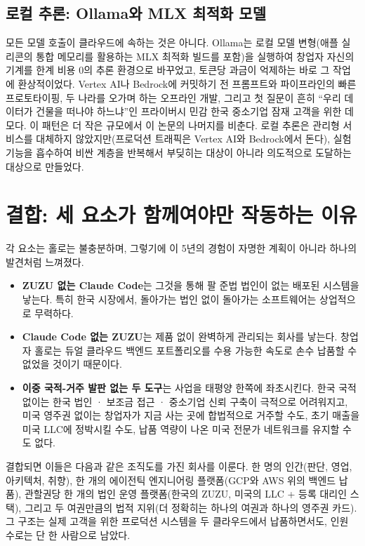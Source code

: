\documentclass{article}
\begin{document}
\subsection{로컬 추론: Ollama와 MLX 최적화 모델}

모든 모델 호출이 클라우드에 속하는 것은 아니다. Ollama는 로컬 모델 변형(애플 실리콘의 통합 메모리를 활용하는 MLX 최적화 빌드를 포함)을 실행하여 창업자 자신의 기계를 한계 비용 0의 추론 환경으로 바꾸었고, 토큰당 과금이 억제하는 바로 그 작업에 환상적이었다. Vertex AI나 Bedrock에 커밋하기 전 프롬프트와 파이프라인의 빠른 프로토타이핑, 두 나라를 오가며 하는 오프라인 개발, 그리고 첫 질문이 흔히 ``우리 데이터가 건물을 떠나야 하느냐''인 프라이버시 민감 한국 중소기업 잠재 고객을 위한 데모다. 이 패턴은 더 작은 규모에서 이 논문의 나머지를 비춘다. 로컬 추론은 관리형 서비스를 대체하지 않았지만(프로덕션 트래픽은 Vertex AI와 Bedrock에서 돈다), 실험 기능을 흡수하여 비싼 계층을 반복해서 부딪히는 대상이 아니라 의도적으로 도달하는 대상으로 만들었다.

\section{결합: 세 요소가 함께여야만 작동하는 이유}

각 요소는 홀로는 불충분하며, 그렇기에 이 5년의 경험이 자명한 계획이 아니라 하나의 발견처럼 느껴졌다.

\begin{itemize}
    \item \textbf{ZUZU 없는 Claude Code}는 그것을 통해 팔 준법 법인이 없는 배포된 시스템을 낳는다. 특히 한국 시장에서, 돌아가는 법인 없이 돌아가는 소프트웨어는 상업적으로 무력하다.
    \item \textbf{Claude Code 없는 ZUZU}는 제품 없이 완벽하게 관리되는 회사를 낳는다. 창업자 홀로는 듀얼 클라우드 백엔드 포트폴리오를 수용 가능한 속도로 손수 납품할 수 없었을 것이기 때문이다.
    \item \textbf{이중 국적-거주 발판 없는 두 도구}는 사업을 태평양 한쪽에 좌초시킨다. 한국 국적 없이는 한국 법인 · 보조금 접근 · 중소기업 신뢰 구축이 극적으로 어려워지고, 미국 영주권 없이는 창업자가 지금 사는 곳에 합법적으로 거주할 수도, 초기 매출을 미국 LLC에 정박시킬 수도, 납품 역량이 나온 미국 전문가 네트워크를 유지할 수도 없다.
\end{itemize}

결합되면 이들은 다음과 같은 조직도를 가진 회사를 이룬다. 한 명의 인간(판단, 영업, 아키텍처, 취향), 한 개의 에이전틱 엔지니어링 플랫폼(GCP와 AWS 위의 백엔드 납품), 관할권당 한 개의 법인 운영 플랫폼(한국의 ZUZU, 미국의 LLC + 등록 대리인 스택), 그리고 두 여권만큼의 법적 지위(더 정확히는 하나의 여권과 하나의 영주권 카드). 그 구조는 실제 고객을 위한 프로덕션 시스템을 두 클라우드에서 납품하면서도, 인원 수로는 단 한 사람으로 남았다.
\end{document}
